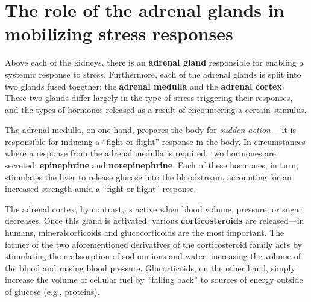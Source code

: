 \documentclass{article}
\begin{document}
\section{The role of the adrenal glands in mobilizing stress responses}

Above each of the kidneys, there is an \textbf{adrenal gland} responsible for
enabling a systemic response to stress. Furthermore, each of the adrenal glands
is split into two glands fused together: the \textbf{adrenal medulla} and the
\textbf{adrenal cortex}. These two glands differ largely in the type of stress
triggering their responses, and the types of hormones released as a result of
encountering a certain stimulus.

The adrenal medulla, on one hand, prepares the body for \emph{sudden action}---
it is responsible for inducing a ``fight or flight'' response in the body. In
circumstances where a response from the adrenal medulla is required, two
hormones are secreted: \textbf{epinephrine} and \textbf{norepinephrine}. Each of
these hormones, in turn, stimulates the liver to release glucose into the
bloodstream, accounting for an increased strength amid a ``fight or flight''
response.

The adrenal cortex, by contrast, is active when blood volume, pressure, or sugar
decreases. Once this gland is activated, various \textbf{corticosteroids} are
released---in humans, mineralcorticoids and glucocorticoids are the most important.
The former of the two aforementioned derivatives of the corticosteroid family acts
by stimulating the reabsorption of sodium ions and water, increasing the volume of
the blood and raising blood pressure. Glucorticoids, on the other hand, simply
increase the volume of cellular fuel by ``falling back'' to sources of energy
outside of glucose (e.g., proteins).
\end{document}
